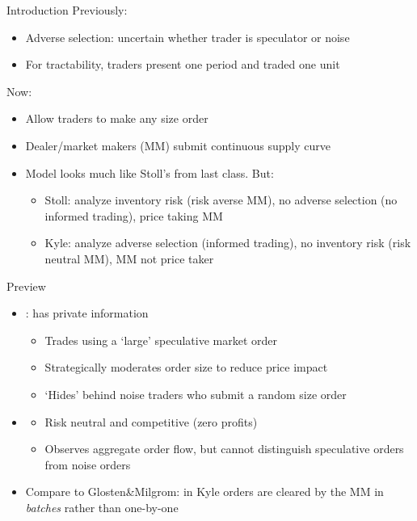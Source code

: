 \documentclass[english,10pt]{beamer}
\begin{document}
\begin{frame}{Introduction}
	Previously:
	\begin{itemize}
		\item Adverse selection: uncertain whether trader is speculator or noise
		\item For tractability, traders present one period and traded one unit
	\end{itemize}
	Now:
	\begin{itemize}
		\item Allow traders to make any size order
		\item Dealer/market makers (MM) submit continuous supply curve 
		\item Model looks much like Stoll's from last class. But:
		\begin{itemize}
			\item Stoll: analyze inventory risk (risk averse MM), no adverse selection (no informed trading), price taking MM
			\item Kyle: analyze adverse selection (informed trading), no inventory risk (risk neutral MM), MM not price taker
		\end{itemize}
	\end{itemize}
\end{frame}


\begin{frame}{Preview}
	\begin{itemize}
		\item {}: has private information
		\begin{itemize}
			\item Trades using a `large' speculative market order
			\item Strategically moderates order size to reduce price impact
			\item `Hides' behind noise traders who submit a random size order
		\end{itemize}
		\item {}
		\begin{itemize}
			\item Risk neutral and competitive (zero profits)
			\item Observes aggregate order flow, but cannot distinguish speculative orders from noise orders
		\end{itemize}
		\item Compare to Glosten\&Milgrom: in Kyle orders are cleared by the MM in \textit{batches} rather than one-by-one
	\end{itemize}
\end{frame}
\end{document}
